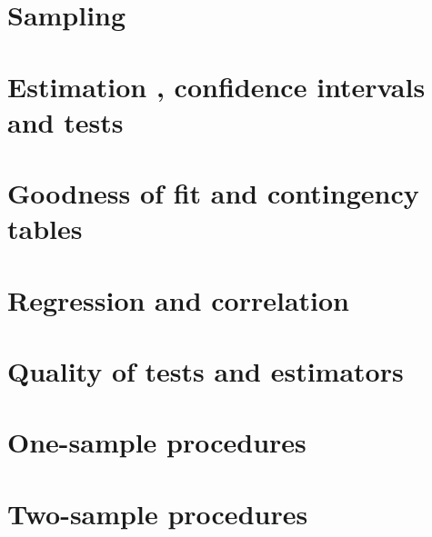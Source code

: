 \documentclass[a4paper]{article}
\begin{document}
\section{Sampling}

\section{Estimation , confidence intervals and tests}

\section{Goodness of fit and contingency tables}

\section{Regression and correlation}

\section{Quality of tests and estimators}

\section{One-sample procedures}

\section{Two-sample procedures}

\printindex
\end{document}
